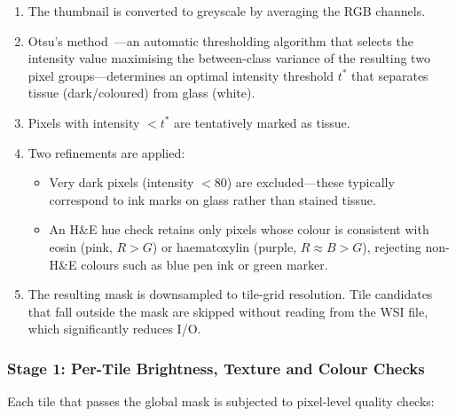\begin{enumerate}
    \item The thumbnail is converted to greyscale by averaging the RGB
    channels.
    \item Otsu's method~\cite{otsu1979threshold}---an automatic
    thresholding algorithm that selects the intensity value maximising
    the between-class variance of the resulting two pixel
    groups---determines an optimal intensity threshold $t^{*}$ that
    separates tissue (dark/coloured) from glass (white).
    \item Pixels with intensity $< t^{*}$ are tentatively marked as
    tissue.
    \item Two refinements are applied:
    \begin{itemize}
        \item Very dark pixels (intensity $< 80$) are excluded---these
        typically correspond to ink marks on glass rather than stained
        tissue.
        \item An H\&E hue check retains only pixels whose colour is
        consistent with eosin (pink, $R > G$) or haematoxylin (purple,
        $R \approx B > G$), rejecting non-H\&E colours such as blue
        pen ink or green marker.
    \end{itemize}
    \item The resulting mask is downsampled to tile-grid resolution.
    Tile candidates that fall outside the mask are skipped without
    reading from the WSI file, which significantly reduces I/O.
\end{enumerate}

\subsubsection{Stage 1: Per-Tile Brightness, Texture and Colour Checks}

Each tile that passes the global mask is subjected to pixel-level
quality checks:

